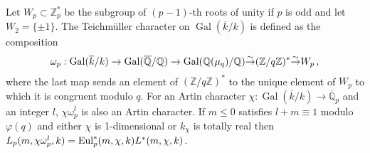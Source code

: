 \documentclass{amsart}
\begin{document}
\begin{remark}\label{interpolrem}
Let $W_p \subset {\mathbb Z}_p^*$ be the subgroup of $(p-1)$-th
roots of unity if $p$ is odd and let $W_2 = \{\pm 1\}$.  The
Teichm\"uller character on ${\operatorname{Gal}}({\overline{k}}/k)$ is defined as the composition
\begin{equation}\label{TM}
\omega_p: {\operatorname{Gal}}({\overline{k}}/k) \to {\operatorname{Gal}}({\overline{\mathbb Q}}/{\mathbb Q}) \to {\operatorname{Gal}}({\mathbb Q}(\mu_q)/{\mathbb Q}) {\buildrel{\sim}\over{\rightarrow}} ({\mathbb Z}/q{\mathbb Z})^* {\buildrel{\sim}\over{\rightarrow}} W_p
\,,
\end{equation}
where the last map sends an element of $({\mathbb Z}/q{\mathbb Z})^*$ to the unique element of $W_p$ to which it is congruent modulo $q$. 
For an Artin character $ \chi : {\operatorname{Gal}}({\overline{k}}/k) \to {{\overline {\mathbb Q}_p}} $ and an integer $ l $,
$\chi\omega_p^l$  is also an Artin character.
If $ m \le 0 $ satisfies $ l+ m \equiv 1 $ modulo $ {\varphi(q)} $ and either $ \chi $ is 1-dimensional
or $ k_\chi $ is totally real then $ {L_{p}(m,{\chi\omega_p^l},k)}= {\textup{Eul}}_p^*(m, \chi, k) {L^\ast(m,{\chi},k)}$.
\end{remark}
\end{document}
